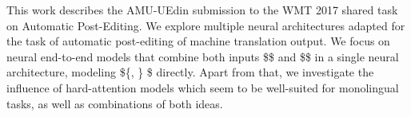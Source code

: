 This work describes the AMU-UEdin submission to the WMT 2017 shared task on Automatic Post-Editing. We explore multiple neural architectures adapted for the task of automatic post-editing of machine translation output.  We focus on neural end-to-end models that combine both inputs \$\mt\$ and \$\src\$ in a single neural architecture, modeling \$\{\mt, \src\} \rightarrow \pe\$ directly. Apart from that, we investigate the influence of hard-attention models which seem to be well-suited for monolingual tasks, as well as combinations of both ideas.
